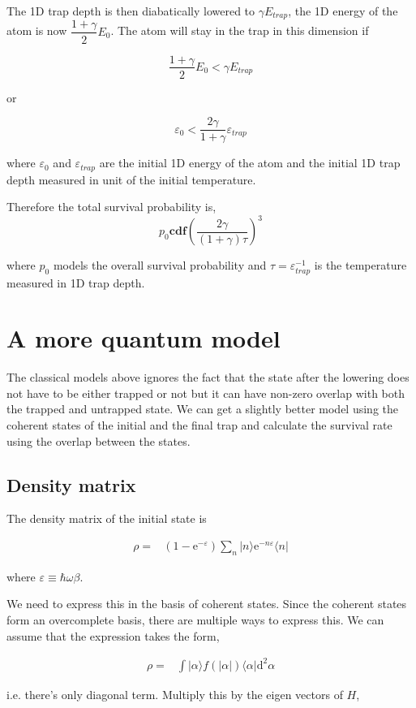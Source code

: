 \documentclass[10pt,fleqn]{article}
\newcommand{\ud}{\mathrm{d}}
\newcommand{\ue}{\mathrm{e}}
\newcommand{\eqar}[1]
{
  \begin{align*}
    #1
  \end{align*}
}
\newcommand{\paren}[1]{{\left({#1}\right)}}
\newcommand{\abs}[1]{{\left|{#1}\right|}}
\begin{document}
The 1D trap depth is then diabatically lowered to $\gamma E_{trap}$,
the 1D energy of the atom is now $\dfrac{1 + \gamma}{2}E_0$. The atom will
stay in the trap in this dimension if

$$\frac{1 + \gamma}{2}E_0 < \gamma E_{trap}$$

or

$$\varepsilon_0 < \frac{2\gamma}{1 + \gamma}\varepsilon_{trap}$$

where $\varepsilon_0$ and $\varepsilon_{trap}$ are the initial 1D energy
of the atom and the initial 1D trap depth measured in unit of the initial
temperature.

Therefore the total survival probability is,
$$p_0 \mathbf{cdf}\left(\frac{2\gamma}{(1 + \gamma) \tau}\right)^3$$

where $p_0$ models the overall survival probability and
$\tau = \varepsilon_{trap}^{-1}$ is the temperature measured in 1D trap depth.

\section{A more quantum model}

The classical models above ignores the fact that the state after the lowering does not have to be either trapped or not but it can have non-zero overlap with both the trapped and untrapped state. We can get a slightly better model using the coherent states of the initial and the final trap and calculate the survival rate using the overlap between the states.

\subsection{Density matrix}

The density matrix of the initial state is

\eqar{
  \rho=&\paren{1-\ue^{-\varepsilon}}\sum_{n}|n\rangle\ue^{-n\varepsilon}\langle n|
}

where $\varepsilon\equiv\hbar\omega\beta$.

We need to express this in the basis of coherent states. Since the coherent states form an overcomplete basis, there are multiple ways to express this. We can assume that the expression takes the form,

\eqar{
  \rho=&\int|\alpha\rangle f(\abs{\alpha}) \langle\alpha|\ud^2\alpha
}

i.e. there's only diagonal term. Multiply this by the eigen vectors of $H$,
\end{document}
